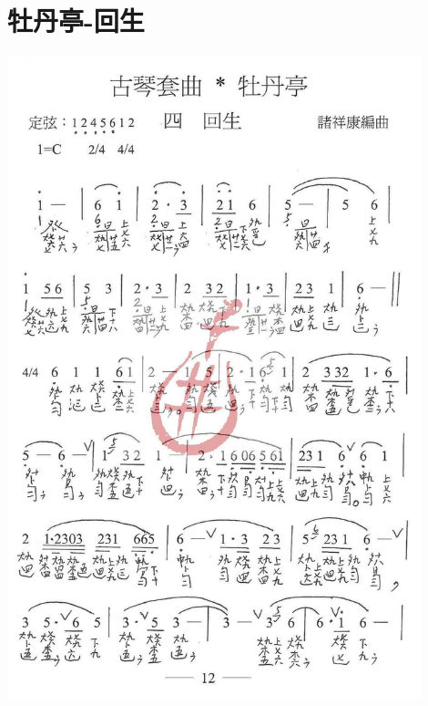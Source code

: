 \documentclass[cn,pad,twocol]{elegantbook}
\begin{document}
\section{牡丹亭-回生}
\paragraph*{\includegraphics[width=0.9\textwidth]{mudanting/2021-牡丹亭-12回生}} 
\end{document}
